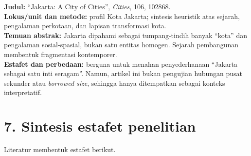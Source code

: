 \documentclass[
  indonesian,
  11pt,
  a4paper,
  oneside,
  openany]{report}
\begin{document}
\textbf{Judul:}
\href{https://doi.org/10.1016/j.cities.2020.102868}{``Jakarta: A City of
Cities''}, \emph{Cities}, 106, 102868.\\
\textbf{Lokus/unit dan metode:} profil Kota Jakarta; sintesis heuristik
atas sejarah, pengalaman perkotaan, dan lapisan transformasi kota.\\
\textbf{Temuan abstrak:} Jakarta dipahami sebagai tumpang-tindih banyak
``kota'' dan pengalaman sosial-spasial, bukan satu entitas homogen.
Sejarah pembangunan membentuk fragmentasi kontemporer.\\
\textbf{Estafet dan perbedaan:} berguna untuk menahan penyederhanaan
``Jakarta sebagai satu inti seragam''. Namun, artikel ini bukan
pengujian hubungan pusat sekunder atau \emph{borrowed size}, sehingga
hanya ditempatkan sebagai konteks interpretatif.

\section{7. Sintesis estafet
penelitian}\label{sintesis-estafet-penelitian}

Literatur membentuk estafet berikut.
\end{document}
